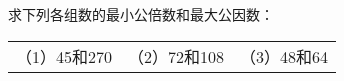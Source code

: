 
求下列各组数的最小公倍数和最大公因数：\\
\begin{tabular}{ccc}
（1）45和270\hspace{12em} & （2）72和108\hspace{12em} & （3）48和64\hspace{12em}\\[12em]
\end{tabular}

